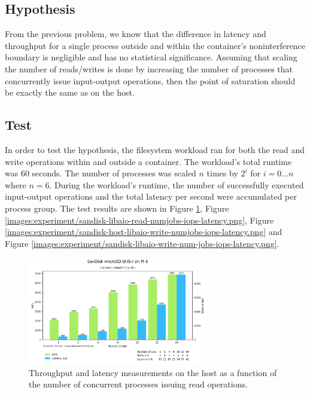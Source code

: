 \subsection{Hypothesis}
From the previous problem, we know that the difference in latency and throughput for a single process outside 
and within the container's noninterference boundary is negligible and has no statistical significance.
Assuming that scaling the number of reads/writes 
is done by increasing the number of processes that concurrently issue input-output operations, then 
the point of saturation should be exactly the same as on the host.

\subsection{Test}
In order to test the hypothesis, the filesystem workload ran for both the read and write 
operations within and outside a container. The workload's total runtime was 60 seconds.
The number of processes was scaled $n$ times by $2^{i}$ for $i = 0\hdots n$ where $n = 6$. 
During the workload's runtime, the number of successfully executed input-output operations and the total latency per second 
were accumulated per process group. The test results are shown in Figure \ref{images:experiment/sandisk-host-libaio-read-numjobs-iops-latency.png},
Figure \ref{images:experiment/sandisk-libaio-read-numjobs-iops-latency.png}, Figure \ref{images:experiment/sandisk-host-libaio-write-numjobs-iops-latency.png}
and Figure \ref{images:experiment/sandisk-libaio-write-num-jobs-iops-latency.png}.

\begin{figure}[H]
    \centering
    \includegraphics[width=0.7\textwidth]{images/results/sandisk-host-libaio-read-numjobs-iops-latency.png}
    \caption{Throughput and latency measurements on the host as a function of the number of concurrent processes issuing read operations.}
    \label{images:experiment/sandisk-host-libaio-read-numjobs-iops-latency.png}
\end{figure}

